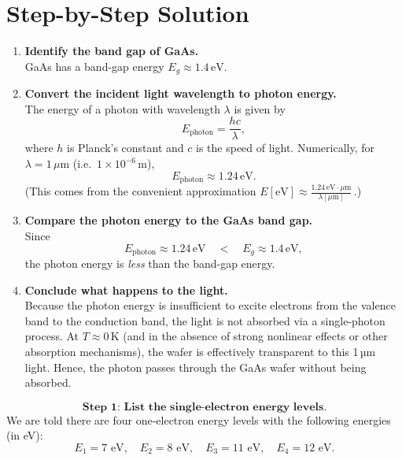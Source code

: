 \documentclass[12pt]{article}
\title{}
\author{Jerich Lee}
\date{\today}
\theoremstyle{definition} %
\theoremstyle{plain} %
\begin{document}
\maketitle
\section*{Step-by-Step Solution}

\begin{enumerate}
    \item \textbf{Identify the band gap of GaAs.} \\
    GaAs has a band-gap energy $E_g \approx 1.4 \,\text{eV}$.

    \item \textbf{Convert the incident light wavelength to photon energy.} \\
    The energy of a photon with wavelength $\lambda$ is given by
    \[
    E_{\text{photon}} = \frac{hc}{\lambda},
    \]
    where $h$ is Planck's constant and $c$ is the speed of light. Numerically, for $\lambda = 1\,\mu\text{m}$ (i.e.\ $1\times 10^{-6}\,\text{m}$),
    \[
    E_{\text{photon}} \approx 1.24\,\text{eV}.
    \]
    (This comes from the convenient approximation $E[\text{eV}] \approx \frac{1.24\,\text{eV}\cdot\mu\text{m}}{\lambda[\mu\text{m}]}\,.$)

    \item \textbf{Compare the photon energy to the GaAs band gap.} \\
    Since 
    \[
    E_{\text{photon}} \approx 1.24\,\text{eV} \quad < \quad E_g \approx 1.4\,\text{eV},
    \]
    the photon energy is \emph{less} than the band-gap energy.

    \item \textbf{Conclude what happens to the light.} \\
    Because the photon energy is insufficient to excite electrons from the valence band to the conduction band, the light is not absorbed via a single-photon process. At $T \approx 0\,\text{K}$ (and in the absence of strong nonlinear effects or other absorption mechanisms), the wafer is effectively transparent to this 1\,µm light. Hence, the photon passes through the GaAs wafer without being absorbed.
\end{enumerate}
\[
\textbf{Step 1: List the single-electron energy levels.}
\]
We are told there are four one-electron energy levels with the following energies (in eV):
\[
E_1 = 7 \text{ eV}, \quad
E_2 = 8 \text{ eV}, \quad
E_3 = 11 \text{ eV}, \quad
E_4 = 12 \text{ eV}.
\]
\end{document}
